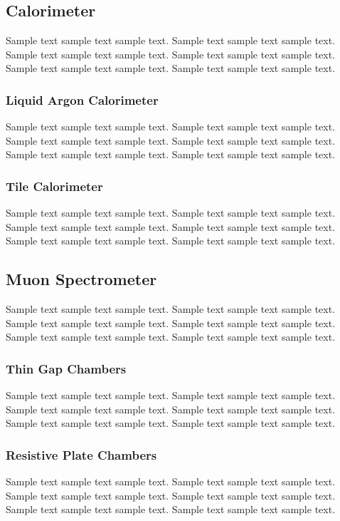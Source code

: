 \subsection{Calorimeter}
Sample text sample text sample text. Sample text sample text sample text.
Sample text sample text sample text. Sample text sample text sample text.
Sample text sample text sample text. Sample text sample text sample text.

\subsubsection{Liquid Argon Calorimeter}
Sample text sample text sample text. Sample text sample text sample text.
Sample text sample text sample text. Sample text sample text sample text.
Sample text sample text sample text. Sample text sample text sample text.

\subsubsection{Tile Calorimeter}
Sample text sample text sample text. Sample text sample text sample text.
Sample text sample text sample text. Sample text sample text sample text.
Sample text sample text sample text. Sample text sample text sample text.

\subsection{Muon Spectrometer}
Sample text sample text sample text. Sample text sample text sample text.
Sample text sample text sample text. Sample text sample text sample text.
Sample text sample text sample text. Sample text sample text sample text.

\subsubsection{Thin Gap Chambers}
Sample text sample text sample text. Sample text sample text sample text.
Sample text sample text sample text. Sample text sample text sample text.
Sample text sample text sample text. Sample text sample text sample text.

\subsubsection{Resistive Plate Chambers}
Sample text sample text sample text. Sample text sample text sample text.
Sample text sample text sample text. Sample text sample text sample text.
Sample text sample text sample text. Sample text sample text sample text.

